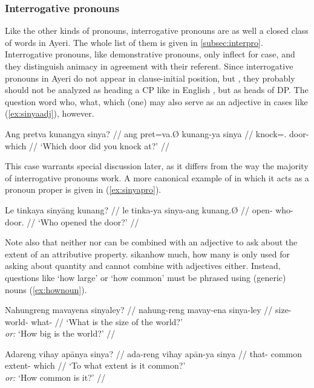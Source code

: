\subsubsection{Interrogative pronouns}

Like the other kinds of pronouns, interrogative pronouns are as well a closed
class of words in Ayeri. The whole list of them is given in
\autoref{subsec:interpro}. Interrogative pronouns, like demonstrative pronouns,
only inflect for case, and they distinguish animacy in agreement with their
referent. Since interrogative pronouns in Ayeri do not appear in clause-initial
position, but , they probably should not be analyzed as heading a
CP like in English \parencites[359--369]{carnie2013}[405--408]{dalrymple2001},
but as heads of DP. The question word  {who, what, which
(one)} may also serve as an adjective in cases like (\ref{ex:sinyaadj}),
however.

\ex\label{ex:sinyaadj}
\begingl
	\gla Ang pretva kunangya sinya? //
	\glb ang pret=va.Ø kunang-ya sinya //
	\glc \AgtT{} knock=\Second{}.\Top{} door-\Loc{} which //
	\glft `Which door did you knock at?' //
\endgl
\xe

This case warrants special discussion later, as it differs from the way the
majority of interrogative pronouns work. A more canonical example of
 in which it acts as a pronoun proper is given in
(\ref{ex:sinyapro}).

\ex\label{ex:sinyapro}
\begingl
	\gla Le tinkaya sinyāng kunang? //
	\glb le tinka-ya sinya-ang kunang.Ø //
	\glc \PatTI{} open-\TsgM{} who-\Aarg{} door.\Top{} //
	\glft `Who opened the door?' //
\endgl
\xe

Note also that neither 
nor  can be combined with an
adjective to ask about the extent of an attributive property. 
{sikan}{how much, how many} is only used for asking about quantity and cannot
combine with adjectives either. Instead, questions like `how large' or `how
common' must be phrased using (generic) nouns (\ref{ex:hownoun}).

\pex\label{ex:hownoun}
\a\begingl
	\gla Nahungreng mavayena sinyaley? //
	\glb nahung-reng mavay-ena sinya-ley //
	\glc size-\AargI{} world-\Gen{} what-\PargI{} //
	\glft `What is the size of the world?' \\
		\textit{or:} `How big is the world?' //
\endgl

\a\begingl
	\gla Adareng vihay apānya sinya? //
	\glb ada-reng vihay apān-ya sinya //
	\glc that-\PargI{} common extent-\Loc{} which //
	\glft `To what extent is it common?' \\
		\textit{or:} `How common is it?' //
\endgl
\xe

